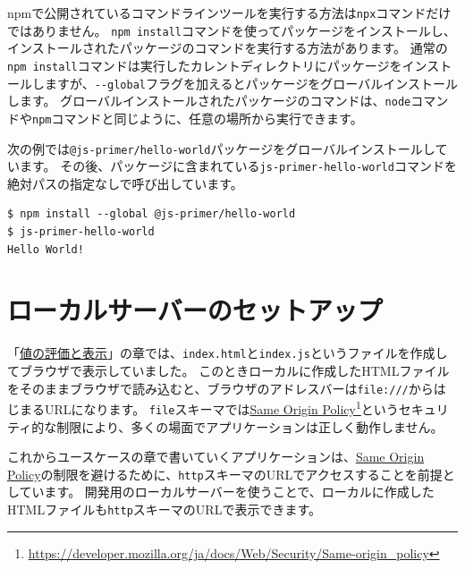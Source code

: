 \begin{tcolorbox}[title=コマンドラインツールのインストールと実行]\label{command-line-tools-installation}

npmで公開されているコマンドラインツールを実行する方法は\texttt{npx}コマンドだけではありません。
\texttt{npm install}コマンドを使ってパッケージをインストールし、インストールされたパッケージのコマンドを実行する方法があります。
通常の\texttt{npm install}コマンドは実行したカレントディレクトリにパッケージをインストールしますが、\texttt{-\/-global}フラグを加えるとパッケージをグローバルインストールします。
グローバルインストールされたパッケージのコマンドは、\texttt{node}コマンドや\texttt{npm}コマンドと同じように、任意の場所から実行できます。

次の例では\texttt{@js-primer/hello-world}パッケージをグローバルインストールしています。
その後、パッケージに含まれている\texttt{js-primer-hello-world}コマンドを絶対パスの指定なしで呼び出しています。

\begin{lstlisting}
$ npm install --global @js-primer/hello-world
$ js-primer-hello-world
Hello World!
\end{lstlisting}
\end{tcolorbox}

\hypertarget{local-server}{%
\section{ローカルサーバーのセットアップ}\label{local-server}}

「\hyperlink{read-eval-print}{値の評価と表示}」の章では、\texttt{index.html}と\texttt{index.js}というファイルを作成してブラウザで表示していました。
このときローカルに作成したHTMLファイルをそのままブラウザで読み込むと、ブラウザのアドレスバーは\texttt{file:///}からはじまるURLになります。
\texttt{file}スキーマでは\href{https://developer.mozilla.org/ja/docs/Web/Security/Same-origin_policy}{Same Origin
Policy}\footnote{\url{https://developer.mozilla.org/ja/docs/Web/Security/Same-origin_policy}}というセキュリティ的な制限により、多くの場面でアプリケーションは正しく動作しません。

これからユースケースの章で書いていくアプリケーションは、\href{https://developer.mozilla.org/ja/docs/Web/Security/Same-origin_policy}{Same Origin
Policy}の制限を避けるために、\texttt{http}スキーマのURLでアクセスすることを前提としています。
開発用のローカルサーバーを使うことで、ローカルに作成したHTMLファイルも\texttt{http}スキーマのURLで表示できます。

